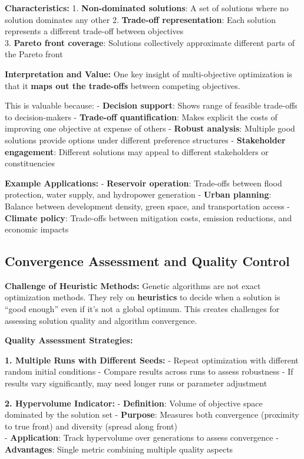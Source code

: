 \documentclass[
  letterpaper,
  DIV=11,
  numbers=noendperiod]{scrreprt}
\begin{document}
\textbf{Characteristics:} 1. \textbf{Non-dominated solutions}: A set of
solutions where no solution dominates any other 2. \textbf{Trade-off
representation}: Each solution represents a different trade-off between
objectives\\
3. \textbf{Pareto front coverage}: Solutions collectively approximate
different parts of the Pareto front

\textbf{Interpretation and Value:} One key insight of multi-objective
optimization is that it \textbf{maps out the trade-offs} between
competing objectives.

This is valuable because: - \textbf{Decision support}: Shows range of
feasible trade-offs to decision-makers - \textbf{Trade-off
quantification}: Makes explicit the costs of improving one objective at
expense of others - \textbf{Robust analysis}: Multiple good solutions
provide options under different preference structures -
\textbf{Stakeholder engagement}: Different solutions may appeal to
different stakeholders or constituencies

\textbf{Example Applications:} - \textbf{Reservoir operation}:
Trade-offs between flood protection, water supply, and hydropower
generation - \textbf{Urban planning}: Balance between development
density, green space, and transportation access - \textbf{Climate
policy}: Trade-offs between mitigation costs, emission reductions, and
economic impacts

\subsection{Convergence Assessment and Quality
Control}\label{convergence-assessment-and-quality-control}

\textbf{Challenge of Heuristic Methods:} Genetic algorithms are not
exact optimization methods. They rely on \textbf{heuristics} to decide
when a solution is ``good enough'' even if it's not a global optimum.
This creates challenges for assessing solution quality and algorithm
convergence.

\textbf{Quality Assessment Strategies:}

\textbf{1. Multiple Runs with Different Seeds:} - Repeat optimization
with different random initial conditions - Compare results across runs
to assess robustness - If results vary significantly, may need longer
runs or parameter adjustment

\textbf{2. Hypervolume Indicator:} - \textbf{Definition}: Volume of
objective space dominated by the solution set - \textbf{Purpose}:
Measures both convergence (proximity to true front) and diversity
(spread along front)\\
- \textbf{Application}: Track hypervolume over generations to assess
convergence - \textbf{Advantages}: Single metric combining multiple
quality aspects
\end{document}
